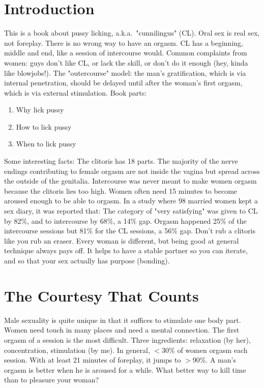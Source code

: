 \section*{Introduction}
\begin{outline}
\1 This is a book about pussy licking, a.k.a.\ "cunnilingus" (CL).
Oral sex is real sex, not foreplay. There is no wrong way to have an orgasm. CL has a beginning, middle and end, like a session of intercourse would.
\1 Common complaints from women: guys don't like CL, or lack the skill, or don't do it enough (hey, kinda like blowjobs!).
\1 The "outercourse" model: the man's gratification, which is via internal penetration, should be delayed until after the woman's first orgasm, which is via external stimulation.
\1 Book parts:
\begin{enumerate}
	\item Why lick pussy
	\item How to lick pussy
	\item When to lick pussy
\end{enumerate}

\1 Some interesting facts:
	\2 The clitoris has 18 parts.
	\2 The majority of the nerve endings contributing to female orgasm are not inside the vagina but spread across the outside of the genitalia. Intercourse was never meant to make women orgasm because the clitoris lies too high.
	\2 Women often need 15 minutes to become aroused enough to be able to orgasm.
\1 In a study where 98 married women kept a sex diary, it was reported that:
	\2 The category of "very satisfying" was given to CL by 82\%, and to intercourse by 68\%, a 14\% gap.
	\2 Orgasm happened 25\% of the intercourse sessions but 81\% for the CL sessions, a 56\% gap.
\1 Don't rub a clitoris like you rub an eraser.
\1 Every woman is different, but being good at general technique always pays off. It helps to have a stable partner so you can iterate, and so that your sex actually has purpose (bonding).
\end{outline}

\bookpart{}
\section{The Courtesy That Counts}
\begin{outline}
\1 Male sexuality is quite unique in that it suffices to stimulate one body part. Women need touch in many places and need a mental connection.
\1 The first orgasm of a session is the most difficult. Three ingredients: relaxation (by her), concentration, stimulation (by me).
\1 In general, $<$30\% of women orgasm each session. With at least 21 minutes of foreplay, it jumps to $>$90\%.
\1 A man's orgasm is better when he is aroused for a while. What better way to kill time than to pleasure your woman?
\end{outline}

